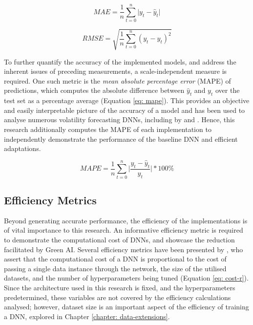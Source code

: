 \documentclass[a4paper, 11pt]{report}
\begin{document}
    \begin{equation}
        \label{eq: mae}
        MAE = \frac{1}{n} \sum_{t=0}^n \lvert y_t - \hat{y}_t \lvert
    \end{equation}
    
    \begin{equation}
        \label{eq: rmse}
        RMSE = \sqrt{\frac{1}{n} \sum_{t=0}^n (y_t - \hat{y}_t)^2}
    \end{equation}


    To further quantify the accuracy of the implemented models, and address the inherent issues of preceding measurements, a scale-independent measure is required. One such metric is the \emph{mean absolute percentage error }(MAPE) of predictions, which computes the absolute difference between $\hat{y}_t$ and $y_t$ over the test set as a percentage average (Equation \ref{eq: mape}). This provides an objective and easily interpretable picture of the accuracy of a model and has been used to analyse numerous volatility forecasting DNNs, including by \citet{xiong-2016} and \citet{zhang-2022}. Hence, this research additionally computes the MAPE of each implementation to independently demonstrate the performance of the baseline DNN and efficient adaptations.


    \begin{equation}
        \label{eq: mape}
        MAPE = \frac{1}{n} \sum_{t=0}^n \bigg\lvert \frac{y_t - \hat{y}_t}{y_t} \bigg\lvert * 100\%
    \end{equation}


    \subsection{Efficiency Metrics}
    \label{section: efficiency-metrics}

    Beyond generating accurate performance, the efficiency of the implementations is of vital importance to this research. An informative efficiency metric is required to demonstrate the computational cost of DNNs, and showcase the reduction facilitated by Green AI. Several efficiency metrics have been presented by \citet{schwartz-2019}, who assert that the computational cost of a DNN is proportional to the cost of passing a single data instance through the network, the size of the utilised datasets, and the number of hyperparameters being tuned (Equation \ref{eq: cost-r}). Since the architecture used in this research is fixed, and the hyperparameters predetermined, these variables are not covered by the efficiency calculations analysed; however, dataset size is an important aspect of the efficiency of training a DNN, explored in Chapter \ref{chapter: data-extensions}.
\end{document}
